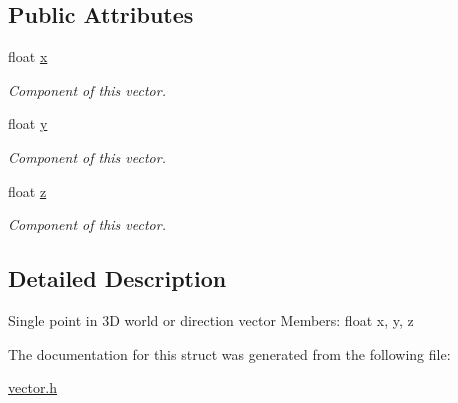 \subsection*{Public Attributes}
\textbf{ }\par
\begin{DoxyCompactItemize}
\item 
\mbox{\label{struct_vector_aca49165049a1e21ae47afcfc078819ed}} 
float \mbox{\hyperlink{struct_vector_aca49165049a1e21ae47afcfc078819ed}{x}}
\begin{DoxyCompactList}\small\item\em Component of this vector. \end{DoxyCompactList}\item 
\mbox{\label{struct_vector_a81be9102fca6d9beea3efef522c4c09d}} 
float \mbox{\hyperlink{struct_vector_a81be9102fca6d9beea3efef522c4c09d}{y}}
\begin{DoxyCompactList}\small\item\em Component of this vector. \end{DoxyCompactList}\item 
\mbox{\label{struct_vector_a0e84237d0830d5c459bfa5676b5fbfba}} 
float \mbox{\hyperlink{struct_vector_a0e84237d0830d5c459bfa5676b5fbfba}{z}}
\begin{DoxyCompactList}\small\item\em Component of this vector. \end{DoxyCompactList}\end{DoxyCompactItemize}



\subsection{Detailed Description}
Single point in 3D world or direction vector Members\+: float x, y, z 

The documentation for this struct was generated from the following file\+:\begin{DoxyCompactItemize}
\item 
\mbox{\hyperlink{vector_8h}{vector.\+h}}\end{DoxyCompactItemize}
